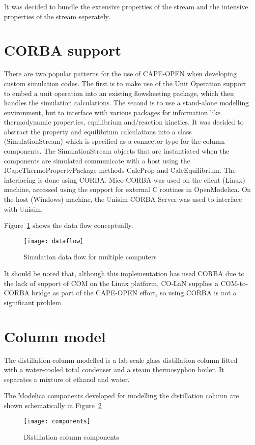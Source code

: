 It was decided to bundle the extensive properties of the stream and the
intensive properties of the stream seperately.

\section{CORBA support}
There are two popular patterns for the use of CAPE-OPEN when
developing custom simulation codes.  The first is to make use of the
Unit Operation support to embed a unit operation into an existing
flowsheeting package, which then handles the simulation calculations.
The second is to use a stand-alone modelling environment, but to
interface with various packages for information like thermodynamic
properties, equilibrium and/reaction kinetics.  It was decided to
abstract the property and equilibrium calculations into a class
(SimulationStream) which is specified as a connector type for the
column components.  The SimulationStream objects that are instantiated
when the components are simulated communicate with a host using the
ICapeThermoPropertyPackage methods CalcProp and CalcEquilibrium.  The
interfacing is done using CORBA.  Mico CORBA was used on the client
(Linux) machine, accessed using the support for external C routines in
OpenModelica.  On the host (Windows) machine, the Unisim CORBA Server
was used to interface with Unisim.

Figure~\ref{fig:dataflow} shows the data flow conceptually.
\begin{figure}[htbp]
  \centering
  \texttt{[image: dataflow]}
  \caption{Simulation data flow for multiple computers}
  \label{fig:dataflow}
\end{figure}

It should be noted that, although this implementation has used CORBA
due to the lack of support of COM on the Linux platform, CO-LaN
supplies a COM-to-CORBA bridge as part of the CAPE-OPEN effort, so
using CORBA is not a significant problem.

\section{Column model}
\label{sec:column-model}
The distillation column modelled is a lab-scale glass distillation
column fitted with a water-cooled total condenser and a steam
thermosyphon boiler.  It separates a mixture of ethanol and water.

The Modelica components developed for modelling the distillation
column are shown schematically in Figure~\ref{fig:components}
\begin{figure}[htbp]
  \centering
  \texttt{[image: components]}
  \caption{Distillation column components}
  \label{fig:components}
\end{figure}

